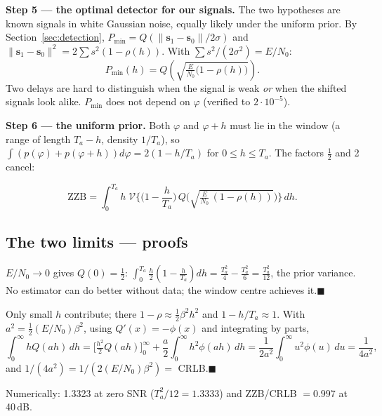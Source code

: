 \documentclass[11pt,a4paper]{article}
\newcommand{\ENo}{E/N_0}
\newcommand{\VF}{\mathcal{V}}
\newcommand{\bs}{\mathbf{s}}
\begin{document}
\textbf{Step 5 --- the optimal detector for our signals.} The two hypotheses are known signals in white Gaussian noise,
equally likely under the uniform prior. By Section~\ref{sec:detection}, $P_{\min}=Q(\|\bs_1-\bs_0\|/2\sigma)$ and
$\|\bs_1-\bs_0\|^2=2\sum s^2(1-\rho(h))$. With $\sum s^2/(2\sigma^2)=\ENo$:
\begin{equation}
P_{\min}(h)=Q\!\left(\sqrt{\tfrac{E}{N_0}\big(1-\rho(h)\big)}\right).
\end{equation}
Two delays are hard to distinguish when the signal is weak \emph{or} when the shifted signals look alike. $P_{\min}$ does not
depend on $\varphi$ (verified to $2\cdot10^{-5}$).

\textbf{Step 6 --- the uniform prior.} Both $\varphi$ and $\varphi+h$ must lie in the window (a range of length $T_a-h$, density
$1/T_a$), so $\int(p(\varphi)+p(\varphi+h))d\varphi=2(1-h/T_a)$ for $0\le h\le T_a$. The factors $\frac12$ and 2 cancel:
\begin{resultbox}
\begin{equation}
\text{ZZB}=\int_0^{T_a}h\;\VF\Big\{\Big(1-\frac h{T_a}\Big)\,Q\Big(\sqrt{\tfrac{E}{N_0}\,(1-\rho(h))}\Big)\Big\}\,dh.
\end{equation}
\end{resultbox}

\subsection{The two limits --- proofs}
\begin{proofbox}
$\ENo\to0$ gives $Q(0)=\frac12$: $\int_0^{T_a}\frac h2(1-\frac h{T_a})dh=\frac{T_a^2}{4}-\frac{T_a^2}{6}=\frac{T_a^2}{12}$, the prior
variance. No estimator can do better without data; the window centre achieves it.\hfill$\blacksquare$
\end{proofbox}
\begin{proofbox}
Only small $h$ contribute; there $1-\rho\approx\frac12\beta^2h^2$ and $1-h/T_a\approx1$. With $a^2=\frac12(\ENo)\beta^2$, using
$Q'(x)=-\phi(x)$ and integrating by parts,
\begin{equation*}
\int_0^\infty hQ(ah)\,dh=\Big[\tfrac{h^2}{2}Q(ah)\Big]_0^\infty+\frac a2\int_0^\infty h^2\phi(ah)\,dh=\frac{1}{2a^2}\int_0^\infty u^2\phi(u)\,du=\frac{1}{4a^2},
\end{equation*}
and $1/(4a^2)=1/(2(\ENo)\beta^2)=$ CRLB.\hfill$\blacksquare$
\end{proofbox}
Numerically: 1.3323 at zero SNR ($T_a^2/12=1.3333$) and ZZB/CRLB $=0.997$ at 40\,dB.
\end{document}
